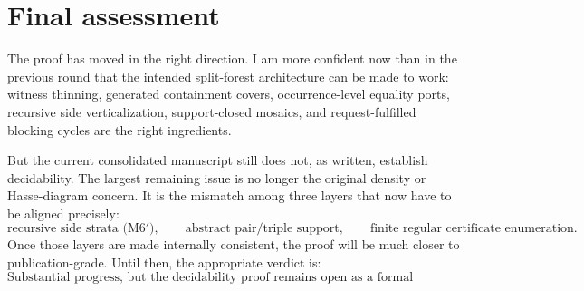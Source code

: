 \documentclass[11pt]{article}
\begin{document}
\section{Final assessment}

The proof has moved in the right direction.  I am more confident now than in the
previous round that the intended split-forest architecture can be made to work:
witness thinning, generated containment covers, occurrence-level equality ports,
recursive side verticalization, support-closed mosaics, and request-fulfilled
blocking cycles are the right ingredients.

But the current consolidated manuscript still does not, as written, establish
decidability.  The largest remaining issue is no longer the original density or
Hasse-diagram concern.  It is the mismatch among three layers that now have to
be aligned precisely:
\[
  \text{recursive side strata (M6$'$)},
  \qquad
  \text{abstract pair/triple support},
  \qquad
  \text{finite regular certificate enumeration}.
\]
Once those layers are made internally consistent, the proof will be much closer
to publication-grade.  Until then, the appropriate verdict is:
\[
  \boxed{\text{Substantial progress, but the decidability proof remains open as a formal manuscript.}}
\]
\end{document}

